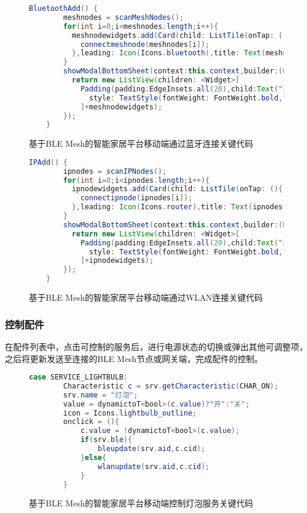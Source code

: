 \begin{figure}[H]
    \centering
    \begin{lstlisting}[language=Java]
    BluetoothAdd() {
        meshnodes = scanMeshNodes();
        for(int i=0;i<meshnodes.length;i++){
          meshnodewidgets.add(Card(child: ListTile(onTap: (){
            connectmeshnode(meshnodes[i]);
          },leading: Icon(Icons.bluetooth),title: Text(meshnodes[i].name))));
        }
        showModalBottomSheet(context:this.context,builder:(BuildContext context) {
          return new ListView(children: <Widget>[
            Padding(padding:EdgeInsets.all(20),child:Text("选择 BLE Mesh 节点",textAlign: TextAlign.left,
              style: TextStyle(fontWeight: FontWeight.bold,fontSize: 20),)),
            ]+meshnodewidgets);
        });
    }
    \end{lstlisting}
    \caption{基于BLE Mesh的智能家居平台移动端通过蓝牙连接关键代码}
    \label{fig:code_mobile_connect_ble}
\end{figure}

\begin{figure}[H]
    \centering
    \begin{lstlisting}[language=Java]
    IPAdd() {
        ipnodes = scanIPNodes();
        for(int i=0;i<ipnodes.length;i++){
          ipnodewidgets.add(Card(child: ListTile(onTap: (){
            connectipnode(ipnodes[i]);
          },leading: Icon(Icons.router),title: Text(ipnodes[i].name),subtitle: Text(ipnodes[i].address))));
        }
        showModalBottomSheet(context:this.context,builder:(BuildContext context) {
          return new ListView(children: <Widget>[
            Padding(padding:EdgeInsets.all(20),child:Text("选择网关",textAlign: TextAlign.left,
              style: TextStyle(fontWeight: FontWeight.bold,fontSize: 20),)),
            ]+ipnodewidgets);
        });
    }
    \end{lstlisting}
    \caption{基于BLE Mesh的智能家居平台移动端通过WLAN连接关键代码}
    \label{fig:code_mobile_connect_wlan}
\end{figure}

\subsubsection{控制配件}
在配件列表中，点击可控制的服务后，进行电源状态的切换或弹出其他可调整项，之后将更新发送至连接的BLE Mesh节点或网关端，完成配件的控制。

\begin{figure}[H]
    \centering
    \begin{lstlisting}[language=Java]
    case SERVICE_LIGHTBULB:
        Characteristic c = srv.getCharacteristic(CHAR_ON);
        srv.name = "灯泡";
        value = dynamictoT<bool>(c.value)?"开":"关";
        icon = Icons.lightbulb_outline;
        onclick = (){
            c.value = !dynamictoT<bool>(c.value);
            if(srv.ble){
                bleupdate(srv.aid,c.cid);
            }else{
                wlanupdate(srv.aid,c.cid);
            }
        }
    \end{lstlisting}
    \caption{基于BLE Mesh的智能家居平台移动端控制灯泡服务关键代码}
    \label{fig:code_mobile_control_lightbulb}
\end{figure}

